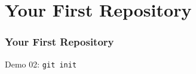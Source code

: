 \section[Section]{Your First Repository}

\begin{frame}
    \frametitle{Your First Repository}
    \alert{Demo 02}: \texttt{git init}
\end{frame}
